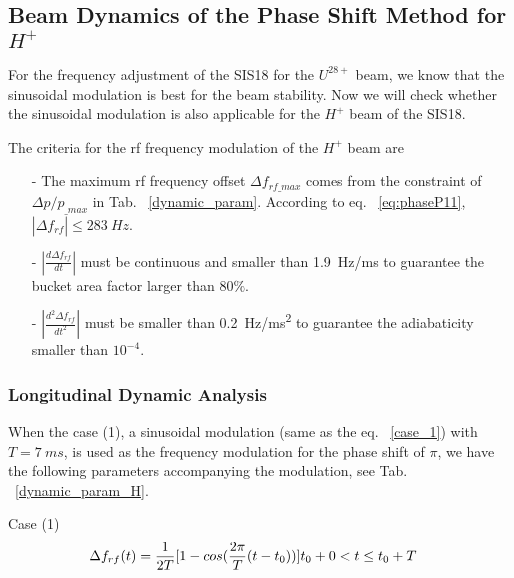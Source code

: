 
\subsection{Beam Dynamics of the Phase Shift Method for $H^+$} 

For the frequency adjustment of the SIS18 for the $U^\mathit{28+}$ beam, we know that the sinusoidal modulation is best for the beam stability. Now we will check whether the sinusoidal modulation is also applicable for the $H^+$ beam of the SIS18.

The criteria for the rf frequency modulation of the $H^+$ beam are
\begin{itemize}
\item[-]
The maximum rf frequency offset $\Delta f_\mathit{rf\_max}$ comes from the constraint of $\Delta p/p_\mathit{\_max}$ in Tab. ~\ref{dynamic_param}. According to eq. ~\ref{eq:phaseP11}, $|\Delta f_\mathit{rf}| \le \SI{283}{Hz}$.
\item[-]
$|\frac{d\Delta f_{\mathit{rf}}}{dt}|$ must be continuous and smaller than \SI{1.9}{Hz/ms} to guarantee the bucket area factor larger than $80\%$. 
\item[-]
$|\frac{d^2\Delta f_{\mathit{rf}}}{dt^2}|$ must be smaller than \SI{0.2}{Hz/ms^2} to guarantee the adiabaticity smaller than $10^{-4}$.
\end{itemize}

	\subsubsection{Longitudinal Dynamic Analysis}
When the case (1), a sinusoidal modulation (same as the eq. ~\ref{case_1}) with $T=\SI{7}{ms}$, is used as the frequency modulation for the phase shift of $\pi$, we have the following parameters accompanying the modulation, see Tab. ~\ref{dynamic_param_H}. 

Case (1) 
\begin{eqnarray}
\Delta f_{rf}(t)=
\frac{1}{2T}  [1-cos(\frac{2\pi}{T}(t-t_0))] &t_0+0<t\le t_0+T\cr  
\end{eqnarray}

